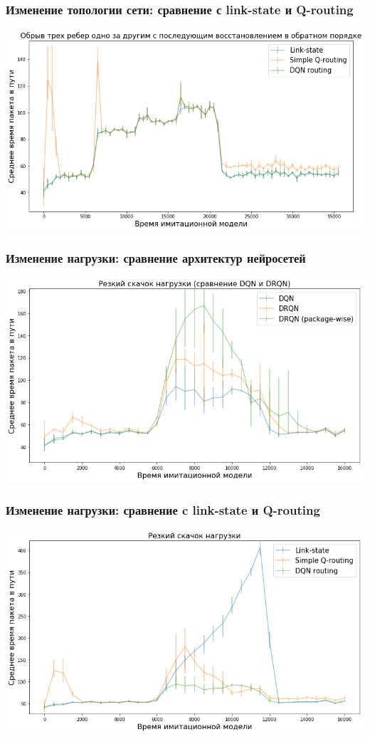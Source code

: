 \documentclass{beamer}
\begin{document}

\begin{frame}
  \frametitle{Изменение топологии сети: сравнение с link-state и Q-routing}
  \includegraphics[width=\textwidth]{experiment-link-failures} 
\end{frame}


\begin{frame}
  \frametitle{Изменение нагрузки: сравнение архитектур нейросетей}
  \includegraphics[width=\textwidth]{experiment-rnn-comparison} 
\end{frame}


\begin{frame}
  \frametitle{Изменение нагрузки: сравнение c link-state и Q-routing}
  \includegraphics[width=\textwidth]{experiment-peak-load} 
\end{frame}
\end{document}
